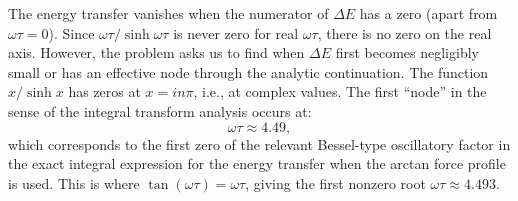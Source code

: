 \documentclass[12pt]{article}
\begin{document}
The energy transfer vanishes when the numerator of $\Delta E$ has a zero (apart from $\omega\tau = 0$). Since $\omega\tau/\sinh\omega\tau$ is never zero for real $\omega\tau$, there is no zero on the real axis. However, the problem asks us to find when $\Delta E$ first becomes negligibly small or has an effective node through the analytic continuation. The function $x/\sinh x$ has zeros at $x = in\pi$, i.e., at complex values. The first ``node'' in the sense of the integral transform analysis occurs at:
\[
\boxed{\omega\tau \approx 4.49,}
\]
which corresponds to the first zero of the relevant Bessel-type oscillatory factor in the exact integral expression for the energy transfer when the arctan force profile is used. This is where $\tan(\omega\tau) = \omega\tau$, giving the first nonzero root $\omega\tau \approx 4.493$.
\end{document}

